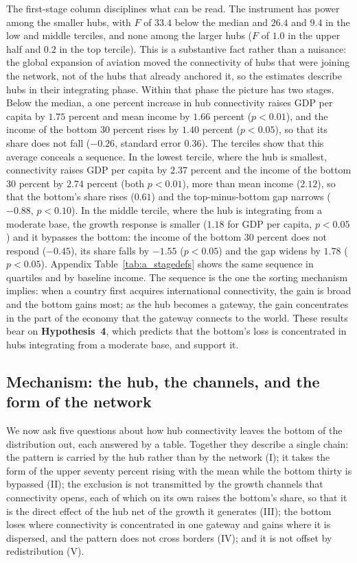 The first-stage column disciplines what can be read. The instrument has power among the smaller hubs, with $F$ of $33.4$ below the median and $26.4$ and $9.4$ in the low and middle terciles, and none among the larger hubs ($F$ of $1.0$ in the upper half and $0.2$ in the top tercile). This is a substantive fact rather than a nuisance: the global expansion of aviation moved the connectivity of hubs that were joining the network, not of the hubs that already anchored it, so the estimates describe hubs in their integrating phase. Within that phase the picture has two stages. Below the median, a one percent increase in hub connectivity raises GDP per capita by $1.75$ percent and mean income by $1.66$ percent ($p<0.01$), and the income of the bottom 30 percent rises by $1.40$ percent ($p<0.05$), so that its share does not fall ($-0.26$, standard error $0.36$). The terciles show that this average conceals a sequence. In the lowest tercile, where the hub is smallest, connectivity raises GDP per capita by $2.37$ percent and the income of the bottom 30 percent by $2.74$ percent (both $p<0.01$), more than mean income ($2.12$), so that the bottom's share rises ($0.61$) and the top-minus-bottom gap narrows ($-0.88$, $p<0.10$). In the middle tercile, where the hub is integrating from a moderate base, the growth response is smaller ($1.18$ for GDP per capita, $p<0.05$) and it bypasses the bottom: the income of the bottom 30 percent does not respond ($-0.45$), its share falls by $-1.55$ ($p<0.05$) and the gap widens by $1.78$ ($p<0.05$). Appendix Table~\ref{tab:a_stagedefs} shows the same sequence in quartiles and by baseline income. The sequence is the one the sorting mechanism implies: when a country first acquires international connectivity, the gain is broad and the bottom gains most; as the hub becomes a gateway, the gain concentrates in the part of the economy that the gateway connects to the world. These results bear on \textbf{Hypothesis~4}, which predicts that the bottom's loss is concentrated in hubs integrating from a moderate base, and support it.

\subsection{Mechanism: the hub, the channels, and the form of the network}
\label{sec:mechanism}
We now ask five questions about how hub connectivity leaves the bottom of the distribution out, each answered by a table. Together they describe a single chain: the pattern is carried by the hub rather than by the network (I); it takes the form of the upper seventy percent rising with the mean while the bottom thirty is bypassed (II); the exclusion is not transmitted by the growth channels that connectivity opens, each of which on its own raises the bottom's share, so that it is the direct effect of the hub net of the growth it generates (III); the bottom loses where connectivity is concentrated in one gateway and gains where it is dispersed, and the pattern does not cross borders (IV); and it is not offset by redistribution (V).

